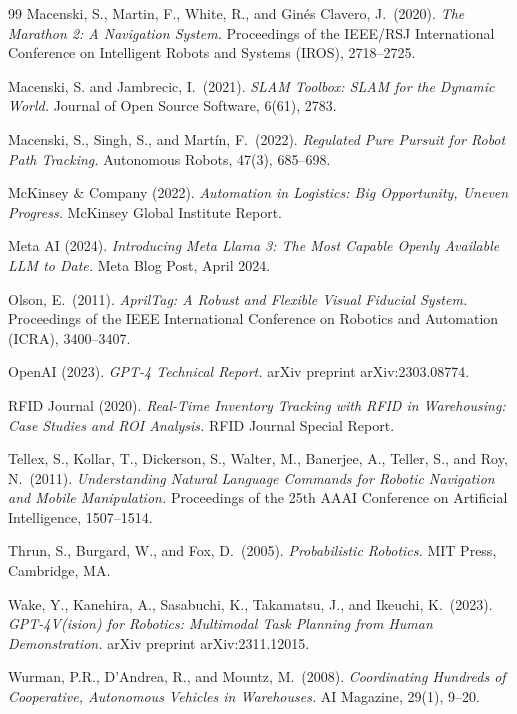 \documentclass[12pt,a4paper]{report}
\begin{document}
\begin{thebibliography}{99}
Macenski, S., Martin, F., White, R., and Ginés Clavero, J.\ (2020).
\textit{The Marathon 2: A Navigation System.}
Proceedings of the IEEE/RSJ International Conference on Intelligent Robots and Systems (IROS), 2718–2725.

Macenski, S. and Jambrecic, I.\ (2021).
\textit{SLAM Toolbox: SLAM for the Dynamic World.}
Journal of Open Source Software, 6(61), 2783.

Macenski, S., Singh, S., and Martín, F.\ (2022).
\textit{Regulated Pure Pursuit for Robot Path Tracking.}
Autonomous Robots, 47(3), 685–698.

McKinsey \& Company (2022).
\textit{Automation in Logistics: Big Opportunity, Uneven Progress.}
McKinsey Global Institute Report.

Meta AI (2024).
\textit{Introducing Meta Llama 3: The Most Capable Openly Available LLM to Date.}
Meta Blog Post, April 2024.

Olson, E.\ (2011).
\textit{AprilTag: A Robust and Flexible Visual Fiducial System.}
Proceedings of the IEEE International Conference on Robotics and Automation (ICRA), 3400–3407.

OpenAI (2023).
\textit{GPT-4 Technical Report.}
arXiv preprint arXiv:2303.08774.

RFID Journal (2020).
\textit{Real-Time Inventory Tracking with RFID in Warehousing: Case Studies and ROI Analysis.}
RFID Journal Special Report.

Tellex, S., Kollar, T., Dickerson, S., Walter, M., Banerjee, A., Teller, S., and Roy, N.\ (2011).
\textit{Understanding Natural Language Commands for Robotic Navigation and Mobile Manipulation.}
Proceedings of the 25th AAAI Conference on Artificial Intelligence, 1507–1514.

Thrun, S., Burgard, W., and Fox, D.\ (2005).
\textit{Probabilistic Robotics.}
MIT Press, Cambridge, MA.

Wake, Y., Kanehira, A., Sasabuchi, K., Takamatsu, J., and Ikeuchi, K.\ (2023).
\textit{GPT-4V(ision) for Robotics: Multimodal Task Planning from Human Demonstration.}
arXiv preprint arXiv:2311.12015.

Wurman, P.R., D'Andrea, R., and Mountz, M.\ (2008).
\textit{Coordinating Hundreds of Cooperative, Autonomous Vehicles in Warehouses.}
AI Magazine, 29(1), 9–20.

\end{thebibliography}
\end{document}
